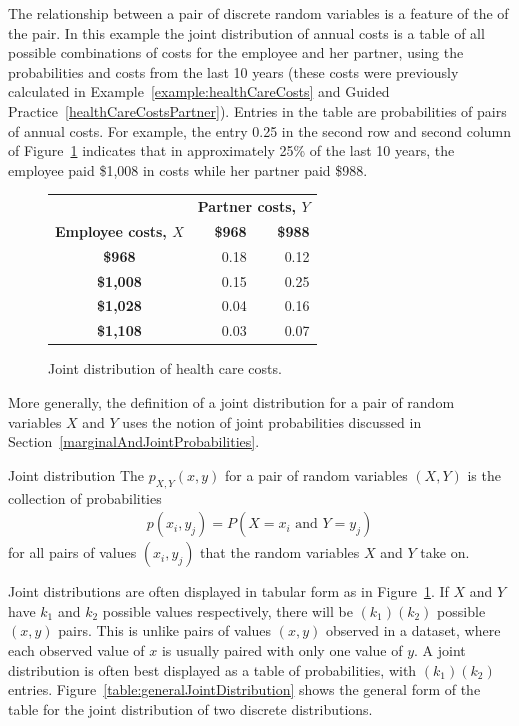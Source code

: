 The relationship between a pair of discrete random variables is a feature of the  of the pair. In this example the joint distribution of annual costs is a table of all possible combinations of costs for the employee and her partner, using the probabilities and costs from the last 10 years (these costs were previously calculated in Example~\ref{example:healthCareCosts}
and Guided Practice~\ref{healthCareCostsPartner}). Entries in the table are probabilities of pairs of annual costs. For example, the entry 0.25 in the second row and second column of Figure~\ref{table:healthExpensesJointDistribution} indicates that in approximately 25\% of the last 10 years, the employee paid \$1,008 in costs while her partner paid \$988.
\begin{figure}[h]
	\centering
	\begin{tabular}{crr}
		\hline
		&   \multicolumn{2}{c}{\textbf{Partner costs, $Y$}} \\
		\textbf{Employee costs, $X$} & \textbf{\$968} & \textbf{\$988} \\ 
		\hline
		\textbf{\$968} & 0.18 & 0.12 \\ 
		\textbf{\$1,008} & 0.15 & 0.25 \\ 
		\textbf{\$1,028}  & 0.04 & 0.16 \\ 
		\textbf{\$1,108}  & 0.03 & 0.07 \\ 
		\hline
	\end{tabular}
	\caption{Joint distribution of health care costs.} 
	\label{table:healthExpensesJointDistribution}
\end{figure}

More generally, the definition of a joint distribution for a pair of random variables $X$ and $Y$ uses the notion of joint probabilities discussed in Section~\ref{marginalAndJointProbabilities}.

\begin{onebox}{Joint distribution}
The  $p_{X, Y}(x, y)$ for a pair of random variables $(X, Y)$ is the collection of probabilities
\begin{align*}
p(x_i,y_j) = P(X=x_i \text{ and } Y = y_j)
\end{align*}
for all pairs of values $(x_i,y_j)$ that the random variables $X$ and $Y$ take on.
\end{onebox}

\textD{\newpage}

Joint distributions are often displayed in tabular form as in Figure~\ref{table:healthExpensesJointDistribution}.  If $X$ and $Y$ have $k_1$ and $k_2$ possible values respectively, there will be $(k_1)(k_2)$ possible $(x,y)$ pairs. This is unlike pairs of values $(x,y)$ observed in a dataset, where each observed value of $x$ is usually paired with only one value of $y$. A joint distribution is often best displayed as a table of probabilities, with $(k_1)(k_2)$ entries.  Figure~\ref{table:generalJointDistribution} shows the general form of the table for the joint distribution of two discrete distributions.

